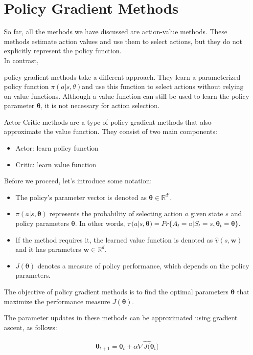 \section{Policy Gradient Methods}
So far, all the methods we have discussed are action-value methods. These methods estimate action values and use them to select actions, but they do not explicitly represent the policy function.\\

In contrast, {policy gradient methods take a different approach. They learn a parameterized policy function $\pi(a|s, \theta)$and use this function to select actions without relying on value functions. Although a value function can still be used to learn the policy parameter $\bm{\theta}$, it is not necessary for action selection.

Actor Critic methods are a type of policy gradient methods that also approximate the value function. They consist of two main components:
\begin{itemize}
    \item Actor: learn policy function
    \item Critic: learn value function
\end{itemize}

Before we proceed, let's introduce some notation:
\begin{itemize}
    \item The policy's parameter vector is denoted as $\bm{\theta}\in\mathbb{R}^{d'}$.
    \item $\pi(a|s, \bm{\theta})$ represents the probability of selecting action $a$ given state $s$ and policy parameters $\bm{\theta}$. In other words, $\pi(a|s, \bm{\theta})=Pr\{A_t=a|S_t=s,\bm{\theta}_t=\bm{\theta}\}$.
    \item If the method requires it, the learned value function is denoted as $\hat{v}(s, \bm{w})$ and it has parameters $\bm{w}\in\mathbb{R}^{d}$.
    \item $J(\bm{\theta})$ denotes a measure of policy performance, which depends on the policy parameters.
\end{itemize}

The objective of policy gradient methods is to find the optimal parameters $\bm{\theta}$ that maximize the performance measure $J(\bm{\theta})$.

The parameter updates in these methods can be approximated using gradient ascent, as follows:

\begin{align}
\bm{\theta}_{t+1} = \bm{\theta}_t + \alpha \widehat{\nabla J(\bm{\theta}_t})
\end{align}

}

